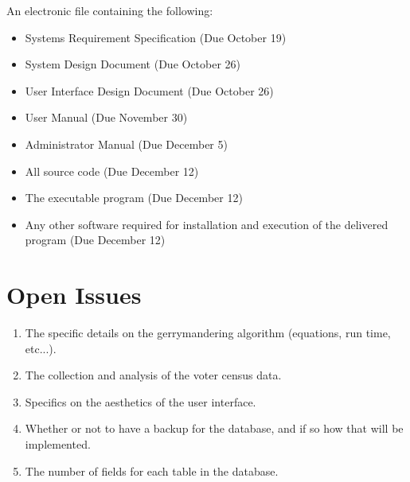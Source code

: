 \documentclass{article}
\begin{document}
\vspace{5mm}

An electronic file containing the following: 

\vspace{2.5mm}

\begin{adjustwidth}{2em}{0pt}
\begin{itemize}

\item Systems Requirement Specification (Due October 19)
\item System Design Document (Due October 26)
\item User Interface Design Document (Due October 26)
\item User Manual (Due November 30)
\item Administrator Manual (Due December 5)
\item All source code (Due December 12)
\item The executable program (Due December 12)
\item Any other software required for installation and execution of the delivered program (Due December 12)

\end{itemize}
\end{adjustwidth}


\section{Open Issues}\label{sec:openIssues}

\vspace{2.5mm}

\begin{addmargin}[2em]{0em}

\begin{enumerate}

\item The specific details on the gerrymandering algorithm (equations, run time, etc...).
\item The collection and analysis of the voter census data.
\item Specifics on the aesthetics of the user interface.
\item Whether or not to have a backup for the database, and if so how that will be implemented.
\item The number of fields for each table in the database.

\end{enumerate}
\end{addmargin}
\end{document}
